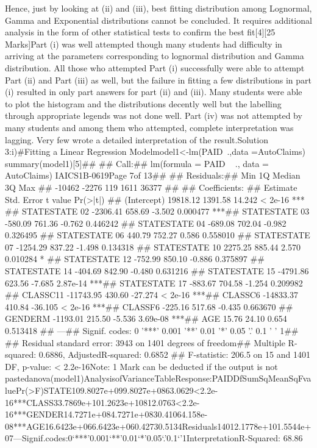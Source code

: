 Hence, just by looking at (ii) and (iii), best fitting distribution among Lognormal, Gamma and Exponential distributions cannot be concluded. 
It requires additional analysis in the form of other statistical tests to confirm the best fit[4][25 Marks]Part (i) was well attempted though many students had difficulty in arriving at the parameters corresponding to lognormal distribution and Gamma distribution. All those who attempted Part (i) successfully were able to attempt Part (ii) and Part (iii) as well, but the failure in fitting a few distributions in part (i) resulted in only part answers for part (ii) and (iii). Many students were able to plot the histogram and the distributions decently well but the labelling through appropriate legends was not done well. Part (iv) was not attempted by many students and among them who attempted, complete interpretation was lagging. Very few wrote a detailed interpretation of the result.Solution 3:i)#Fitting a Linear Regression Modelmodel1<-lm(PAID~.,data =AutoClaims)
summary(model1)[5]## ## Call:## lm(formula = PAID ~ ., data = AutoClaims)
IAICS1B-0619Page 7of 13## ## Residuals:##    Min     1Q Median     3Q    Max ## -10462  -2276    119   1611  36377 ## ## Coefficients:
##                Estimate Std. Error t value Pr(>|t|)    ## (Intercept)    19818.12    1391.58  14.242  < 2e-16 ***
## STATESTATE 02  -2306.41     658.69  -3.502 0.000477 ***## STATESTATE 03   -580.09     761.36  -0.762 0.446242    
## STATESTATE 04   -689.08     702.04  -0.982 0.326495    ## STATESTATE 06    440.79     752.27   0.586 0.558010    
## STATESTATE 07  -1254.29     837.22  -1.498 0.134318    ## STATESTATE 10   2275.25     885.44   2.570 0.010284 *  
## STATESTATE 12   -752.99     850.10  -0.886 0.375897    ## STATESTATE 14   -404.69     842.90  -0.480 0.631216    
## STATESTATE 15  -4791.86     623.56  -7.685 2.87e-14 ***## STATESTATE 17   -883.67     704.58  -1.254 0.209982    ## CLASSC11      -11743.95     430.60 -27.274  < 2e-16 ***## CLASSC6       -14833.37     410.84 -36.105  < 2e-16 ***## CLASSF6         -225.16     517.68  -0.435 0.663670    ## GENDERM        -1193.01     215.50  -5.536 3.69e-08 ***## AGE               15.76      24.10   0.654 0.513418    ## ---## Signif. codes:  0 '***' 0.001 '**' 0.01 '*' 0.05 '.' 0.1 ' ' 1## ## Residual standard error: 3943 on 1401 degrees of freedom## Multiple R-squared:  0.6886, AdjustedR-squared:  0.6852 ## F-statistic: 206.5 on 15 and 1401 DF,  p-value: < 2.2e-16Note: 1 Mark can be deducted if the output is not pastedanova(model1)AnalysisofVarianceTableResponse:PAIDDfSumSqMeanSqFvaluePr(>F)STATE109.8027e+099.8027e+0863.0629<2.2e-16***CLASS33.7869e+101.2623e+10812.0763<2.2e-16***GENDER14.7271e+084.7271e+0830.41064.158e-08***AGE16.6423e+066.6423e+060.42730.5134Residuals14012.1778e+101.5544e+07---Signif.codes:0‘***’0.001‘**’0.01‘*’0.05‘.’0.1‘’1InterpretationR-Squared: 68.86%

